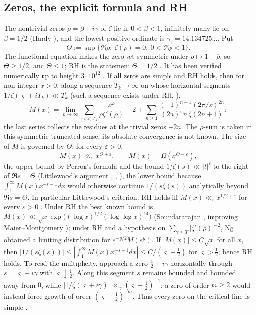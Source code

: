 \documentclass[11pt]{amsart}
\numberwithin{equation}{section}
\theoremstyle{plain}
\theoremstyle{definition}
\theoremstyle{remark}
\newcommand{\eps}{\varepsilon}
\begin{document}
\subsection{Zeros, the explicit formula and RH}
The nontrivial zeros $\rho=\beta+i\gamma$ of $\zeta$ lie in $0<\beta<1$,
infinitely many lie on $\beta=1/2$ (Hardy \cite{Hardy1914}), and the lowest
positive ordinate is $\gamma_1=14.134725\ldots$. Put
\[
\Theta:=\sup\{\Re\rho:\ \zeta(\rho)=0,\ 0<\Re\rho<1\}.
\]
The functional equation makes the zero set symmetric under
$\rho\mapsto1-\overline\rho$, so $\Theta\ge1/2$, and $\Theta\le1$; RH is the
statement $\Theta=1/2$ \cite{Riemann1859}. It
has been verified numerically up to height $3\cdot10^{12}$
\cite{PlattTrudgian2021}. If all zeros are simple and RH holds, then for non-integer $x>0$,
along a sequence $T_k\to\infty$ on whose horizontal segments
$1/\zeta(\varsigma+iT_k)\ll T_k^{\eps}$ (such a sequence exists under RH,
\cite[\S14.16]{Titchmarsh1986}), \cite[\S14.27]{Titchmarsh1986}
\[
M(x)=\lim_{k\to\infty}\sum_{|\gamma|<T_k}\frac{x^\rho}{\rho\zeta'(\rho)}-2+
\sum_{n\ge1}\frac{(-1)^{n-1}(2\pi/x)^{2n}}{(2n)!\,n\,\zeta(2n+1)} ;
\]
the last series collects the residues at the trivial zeros $-2n$. The
$\rho$-sum is taken in this symmetric truncated sense; its absolute
convergence is not known.
The size of $M$ is governed by $\Theta$: for every $\eps>0$,
\[
M(x)\ll_\eps x^{\Theta+\eps},\qquad M(x)=\Omega(x^{\Theta-\eps}),
\]
the upper bound by Perron's formula and the bound $1/\zeta(s)\ll|t|^{\eps}$
to the right of $\Re s=\Theta$ (Littlewood's argument
\cite{Littlewood1912}, \cite[\S14.25]{Titchmarsh1986}, \cite[\S4]{Pintz2026}),
the lower bound because $\int_1^\infty M(x)x^{-s-1}dx$ would otherwise
continue $1/(s\zeta(s))$ analytically beyond $\Re s=\Theta$. In particular
Littlewood's criterion: RH holds iff $M(x)\ll_\eps x^{1/2+\eps}$ for every
$\eps>0$ \cite{Littlewood1912}. Under RH the best known bound is
$M(x)\ll\sqrt x\exp\bigl((\log x)^{1/2}(\log\log x)^{14}\bigr)$
(Soundararajan \cite{Soundararajan2009}, improving Maier--Montgomery
\cite{MaierMontgomery2009}); under RH and a hypothesis on
$\sum_{\gamma\le T}|\zeta'(\rho)|^{-2}$, Ng \cite{Ng2004} obtained a limiting
distribution for $e^{-y/2}M(e^y)$. If $|M(x)|\le C\sqrt x$ for all $x$, then
$|1/(s\zeta(s))|\le|\int_1^\infty M(x)x^{-s-1}dx|\le C/(\varsigma-\frac12)$
for $\varsigma>\frac12$; hence RH holds.  To read the multiplicity, approach a
zero $\frac12+i\gamma$ horizontally through $s=\varsigma+i\gamma$ with
$\varsigma\downarrow\frac12$.  Along this segment $s$ remains bounded and
bounded away from $0$, while
$|1/\zeta(\varsigma+i\gamma)|\ll_\gamma(\varsigma-\frac12)^{-1}$; a zero of order
$m\ge2$ would instead force growth of order
$(\varsigma-\frac12)^{-m}$.  Thus every zero on the critical line is simple
\cite[\S14.29]{Titchmarsh1986}.
\end{document}
